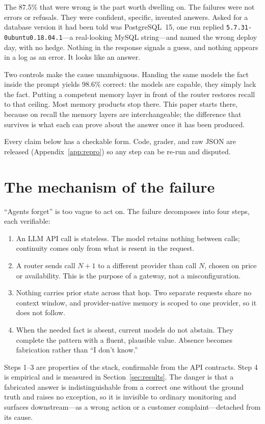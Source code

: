 \documentclass[11pt]{article}
\begin{document}
The 87.5\% that were wrong is the part worth dwelling on. The failures were not errors or
refusals. They were confident, specific, invented answers. Asked for a database version it
had been told was PostgreSQL~15, one run replied \texttt{5.7.31-0ubuntu0.18.04.1}---a
real-looking MySQL string---and named the wrong deploy day, with no hedge. Nothing in the
response signals a guess, and nothing appears in a log as an error. It looks like an
answer.

Two controls make the cause unambiguous. Handing the same models the fact inside the prompt
yields 98.6\% correct: the models are capable, they simply lack the fact. Putting a
competent memory layer in front of the router restores recall to that ceiling. Most memory
products stop there. This paper starts there, because on recall the memory layers are
interchangeable; the difference that survives is what each can prove about the answer once
it has been produced.

Every claim below has a checkable form. Code, grader, and raw JSON are released
(Appendix~\ref{app:repro}) so any step can be re-run and disputed.

\section{The mechanism of the failure}\label{sec:mech}

``Agents forget'' is too vague to act on. The failure decomposes into four steps, each
verifiable:

\begin{enumerate}[topsep=2pt,itemsep=1pt]
\item An LLM API call is stateless. The model retains nothing between calls; continuity
  comes only from what is resent in the request.
\item A router sends call $N{+}1$ to a different provider than call $N$, chosen on price or
  availability. This is the purpose of a gateway, not a misconfiguration.
\item Nothing carries prior state across that hop. Two separate requests share no context
  window, and provider-native memory is scoped to one provider, so it does not follow.
\item When the needed fact is absent, current models do not abstain. They complete the
  pattern with a fluent, plausible value. Absence becomes fabrication rather than ``I don't
  know.''
\end{enumerate}

Steps 1--3 are properties of the stack, confirmable from the API contracts. Step 4 is
empirical and is measured in Section~\ref{sec:results}. The danger is that a fabricated
answer is indistinguishable from a correct one without the ground truth and raises no
exception, so it is invisible to ordinary monitoring and surfaces downstream---as a wrong
action or a customer complaint---detached from its cause.
\end{document}
